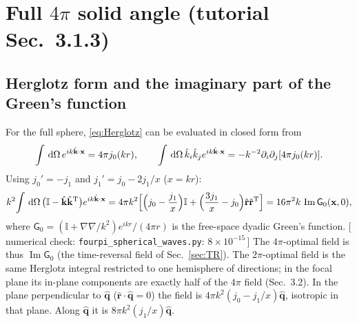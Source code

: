 \documentclass[11pt,letterpaper]{article}
\newcommand{\vect}[1]{\mathbf{#1}}
\newcommand{\xv}{\vect{x}}
\newcommand{\kv}{\vect{k}}
\newcommand{\khat}{\hat{\kv}}
\newcommand{\rhat}{\hat{\vect{r}}}
\newcommand{\qhat}{\hat{\vect{q}}}
\newcommand{\dO}{\,{\rm d}\Omega}
\newcommand{\II}{\mathbb{I}}
\renewcommand{\Im}{\operatorname{Im}}
\newcommand{\code}[1]{\texttt{\small #1}}
\newcommand{\numcheck}[1]{\hfill{\small\color{green!40!black}[\,numerical check: #1\,]}}
\begin{document}
\section{Full \texorpdfstring{$4\pi$}{4 pi} solid angle (tutorial Sec.~3.1.3)}\label{sec:4pi}
\subsection{Herglotz form and the imaginary part of the Green's function}
For the full sphere, \eqref{eq:Herglotz} can be evaluated in closed form from
\begin{align*}
\int\dO\,e^{ik\khat\cdot\xv}=4\pi j_0(kr),\qquad \int\dO\,\hat k_i\hat k_je^{ik\khat\cdot\xv}=-k^{-2}\partial_i\partial_j[4\pi j_0(kr)].
\end{align*}
Using $j_0'=-j_1$ and $j_1'=j_0-2j_1/x$ ($x=kr$):
\begin{align}
    k^2\!\int\dO\,\big(\II-\khat\khat^{\rm T}\big)e^{ik\khat\cdot\xv}
    = 4\pi k^2\Big[\Big(j_0-\frac{j_1}{x}\Big)\II+\Big(\frac{3j_1}{x}-j_0\Big)\rhat\rhat^{\rm T}\Big]
    = 16\pi^2k\,\Im\mathsf{G}_0(\xv,0),
    \label{eq:ImG}
\end{align}
where $\mathsf G_0=(\II+\nabla\nabla/k^2)e^{ikr}/(4\pi r)$ is the free-space dyadic Green's function.
\numcheck{\code{fourpi\_spherical\_waves.py}: $8\times10^{-15}$}
The $4\pi$-optimal field is thus $\Im\mathsf G_0$ (the time-reversal field of Sec.~\ref{sec:TR}). The $2\pi$-optimal field is the same Herglotz integral restricted to one hemisphere of directions; in the focal plane its in-plane components are exactly half of the $4\pi$ field (Sec.~3.2). In the plane perpendicular to $\qhat$ ($\rhat\cdot\qhat=0$) the field is $4\pi k^2(j_0-j_1/x)\qhat$, isotropic in that plane. Along $\qhat$ it is $8\pi k^2(j_1/x)\qhat$.
\end{document}
